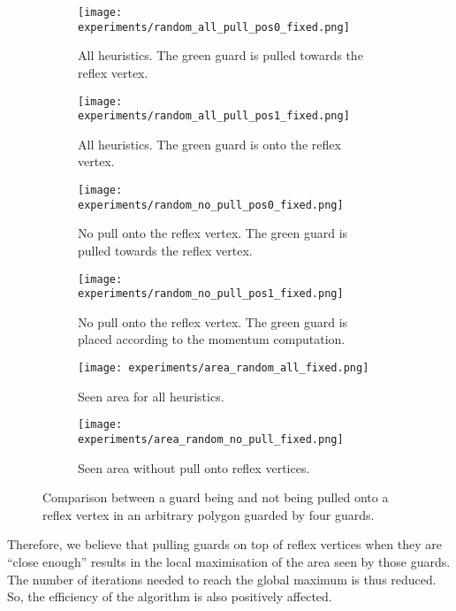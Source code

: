 \begin{figure}[h!]
    \centering
    \begin{subfigure}{0.45\textwidth}
        \texttt{[image: experiments/random\_all\_pull\_pos0\_fixed.png]}
        \caption{All heuristics. The green guard is pulled towards the reflex vertex.}
        \label{fig:all_pull_pos0}
    \end{subfigure}
    \hfill
    \begin{subfigure}{0.45\textwidth}
        \texttt{[image: experiments/random\_all\_pull\_pos1\_fixed.png]}
        \caption{All heuristics. The green guard is onto the reflex vertex.}
        \label{fig:all_pull_pos1}
    \end{subfigure}
    \vfill
    \begin{subfigure}{0.45\textwidth}
        \texttt{[image: experiments/random\_no\_pull\_pos0\_fixed.png]}
        \caption{No pull onto the reflex vertex. The green guard is pulled towards the reflex vertex.}
        \label{fig:no_pull_pos0}
    \end{subfigure}
    \hfill
    \begin{subfigure}{0.45\textwidth}
        \texttt{[image: experiments/random\_no\_pull\_pos1\_fixed.png]}
        \caption{No pull onto the reflex vertex. The green guard is placed according to the momentum computation.}
        \label{fig:no_pull_pos1}
    \end{subfigure}
    \vfill
    \begin{subfigure}{0.45\textwidth}
        \texttt{[image: experiments/area\_random\_all\_fixed.png]}
        \caption{Seen area for all heuristics.}
        \label{fig:area_all_pull}
    \end{subfigure}
    \hfill
    \begin{subfigure}{0.45\textwidth}
        \texttt{[image: experiments/area\_random\_no\_pull\_fixed.png]}
        \caption{Seen area without pull onto reflex vertices.}
        \label{fig:area_no_pull}
    \end{subfigure}
    \caption{Comparison between a guard being and not being pulled onto a reflex vertex in an arbitrary polygon guarded by four guards.}
    \label{fig:no_pull}
\end{figure}


Therefore, we believe that pulling guards on top of reflex vertices when they are ``close enough'' results in the local maximisation of the area seen by those guards. The number of iterations needed to reach the global maximum is thus reduced. So, the efficiency of the algorithm is also positively affected.

